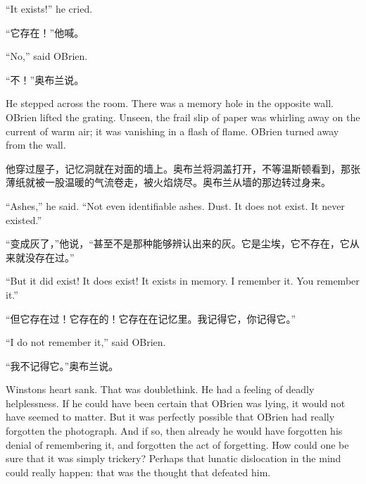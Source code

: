 \begin{paracol}{2}
\switchcolumn*

``It exists!'' he cried.

\switchcolumn

``它存在！''他喊。

\switchcolumn*

``No,'' said O\textquotesingle Brien.

\switchcolumn

``不！''奥布兰说。

\switchcolumn*

He stepped across the room. There was a memory hole in the opposite
wall. O\textquotesingle Brien lifted the grating. Unseen, the frail slip
of paper was whirling away on the current of warm air; it was vanishing
in a flash of flame. O\textquotesingle Brien turned away from the wall.

\switchcolumn

他穿过屋子，记忆洞就在对面的墙上。奥布兰将洞盖打开，不等温斯顿看到，那张薄纸就被一股温暖的气流卷走，被火焰烧尽。奥布兰从墙的那边转过身来。

\switchcolumn*

``Ashes,'' he said. ``Not even identifiable ashes. Dust. It does not exist.
It never existed.''

\switchcolumn

``变成灰了，''他说，``甚至不是那种能够辨认出来的灰。它是尘埃，它不存在，它从来就没存在过。''

\switchcolumn*

``But it did exist! It does exist! It exists in memory. I remember it.
You remember it.''

\switchcolumn

``但它存在过！它存在的！它存在在记忆里。我记得它，你记得它。''

\switchcolumn*

``I do not remember it,'' said O\textquotesingle Brien.

\switchcolumn

``我不记得它。''奥布兰说。

\switchcolumn*

Winston\textquotesingle s heart sank. That was doublethink. He had a
feeling of deadly helplessness. If he could have been certain that
O\textquotesingle Brien was lying, it would not have seemed to matter.
But it was perfectly possible that O\textquotesingle Brien had really
forgotten the photograph. And if so, then already he would have
forgotten his denial of remembering it, and forgotten the act of
forgetting. How could one be sure that it was simply trickery? Perhaps
that lunatic dislocation in the mind could really happen: that was the
thought that defeated him.


\end{paracol}
